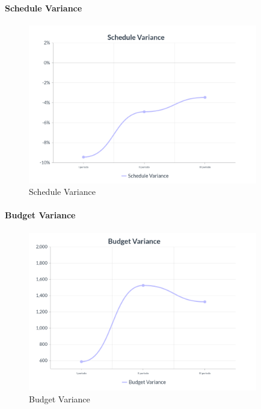 \paragraph{Schedule Variance}
\begin{center}
\begin{figure}[H]
  \centering
  \renewcommand{\thefigure}{5}
  \includegraphics[width=10cm]{./res/images/SVGraph.png}
  \caption{Schedule Variance}
  \label{fig:Grafico Schedule Variance}
\end{figure}
\end{center}
\pagebreak
\paragraph{Budget Variance}
\begin{center}
\begin{figure}[H]
  \centering
  \renewcommand{\thefigure}{6}
  \includegraphics[width=10cm]{./res/images/BVGraph.png}
  \caption{Budget Variance}
  \label{fig:Grafico Budget Variance}
\end{figure}
\end{center}

